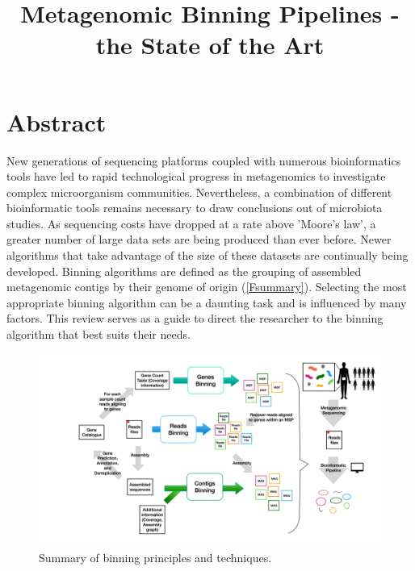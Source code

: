 \documentclass{article}
\title{Metagenomic Binning Pipelines - the State of the Art}
\date{}
\begin{document}
\maketitle

\tableofcontents

\section{Abstract}
New generations of sequencing platforms coupled with numerous bioinformatics tools have led to rapid technological progress in metagenomics to investigate complex microorganism communities.
Nevertheless, a combination of different bioinformatic tools remains necessary to draw conclusions out of microbiota studies.
As sequencing costs have dropped at a rate above 'Moore's law', a greater number of large data sets are being produced than ever before.
Newer algorithms that take advantage of the size of these datasets are continually being developed.
Binning algorithms are defined as the grouping of assembled metagenomic contigs by their genome of origin (\autoref{Fsummary}).
Selecting the most appropriate binning algorithm can be a daunting task and is influenced by many factors.
This review serves as a guide to direct the researcher to the binning algorithm that best suits their needs.

\begin{figure}
\centering
\includegraphics[scale=0.2]{figures/figure_binning_software.001.pdf}
\caption["Summary of binning principles and techniques"]{
	Summary of binning principles and techniques.}
\label{Fsummary}
\end{figure}
\end{document}
